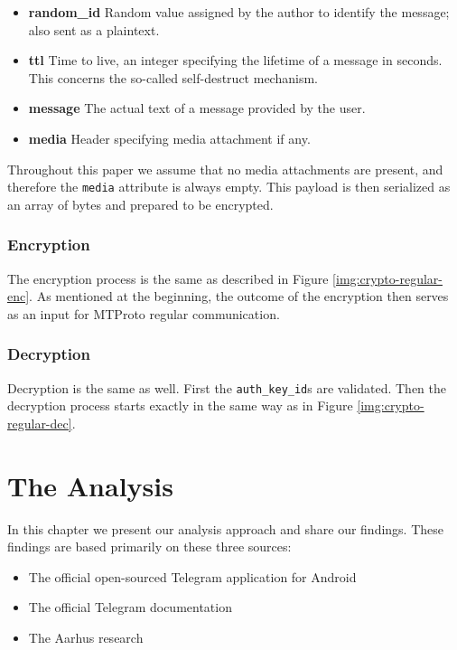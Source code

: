 \documentclass[thesis=M,english]{FITthesis}[2012/10/20]
\begin{document}
\begin{itemize}
	\item \textbf{random\_id} Random value assigned by the author to identify the message; also sent as a plaintext.
	\item  \textbf{ttl} Time to live, an integer specifying the lifetime of a message in seconds. This concerns the so-called self-destruct mechanism.
	\item \textbf{message} The actual text of a message provided by the user.
	\item \textbf{media} Header specifying media attachment if any.
\end{itemize}

Throughout this paper we assume that no media attachments are present, and therefore the \texttt{media} attribute is always empty. This payload is then serialized as an array of bytes and prepared to be encrypted.

\subsection{Encryption}\label{crypto-secret-enc}

The encryption process is the same as described in Figure \ref{img:crypto-regular-enc}. As mentioned at the beginning, the outcome of the encryption then serves as an input for MTProto regular communication.

\subsection{Decryption}\label{crypto-secret-dec}

Decryption is the same as well. First the \texttt{auth\_key\_id}s are validated.  Then the decryption process starts exactly in the same way as in Figure \ref{img:crypto-regular-dec}.





\chapter{The Analysis}\label{analysis}

In this chapter we present our analysis approach and share our findings. These findings are based primarily on these three sources:

\begin{itemize}
	\item The official open-sourced Telegram application for Android
	\item The official Telegram documentation
	\item The Aarhus research~\cite{telegram-aarhus}
\end{itemize}
\end{document}
